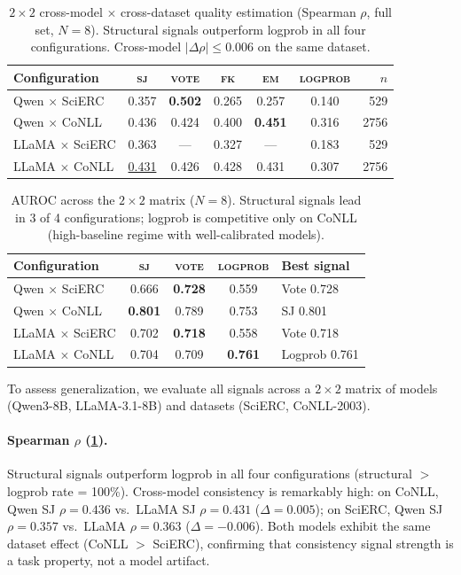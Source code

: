 \documentclass[11pt]{article}
\begin{document}
\begin{table}[t]
\centering
\caption{$2{\times}2$ cross-model $\times$ cross-dataset quality estimation (Spearman $\rho$, full set, $N{=}8$). Structural signals outperform logprob in all four configurations. Cross-model $|\Delta\rho| \le 0.006$ on the same dataset.}
\label{tab:2x2-rho}
\small
\begin{tabular}{l ccccc r}
\toprule
Configuration & \textsc{sj} & \textsc{vote} & \textsc{fk} & \textsc{em} & \textsc{logprob} & $n$ \\
\midrule
Qwen $\times$ SciERC   & 0.357 & \textbf{0.502} & 0.265 & 0.257 & 0.140 & 529 \\
Qwen $\times$ CoNLL    & 0.436 & 0.424 & 0.400 & \textbf{0.451} & 0.316 & 2756 \\
LLaMA $\times$ SciERC  & 0.363 & --- & 0.327 & --- & 0.183 & 529 \\
LLaMA $\times$ CoNLL   & \underline{0.431} & 0.426 & 0.428 & 0.431 & 0.307 & 2756 \\
\bottomrule
\end{tabular}
\end{table}

\begin{table}[t]
\centering
\caption{AUROC across the $2{\times}2$ matrix ($N{=}8$). Structural signals lead in 3 of 4 configurations; logprob is competitive only on CoNLL (high-baseline regime with well-calibrated models).}
\label{tab:2x2-auroc}
\small
\begin{tabular}{l ccc l}
\toprule
Configuration & \textsc{sj} & \textsc{vote} & \textsc{logprob} & Best signal \\
\midrule
Qwen $\times$ SciERC  & 0.666 & \textbf{0.728} & 0.559 & Vote 0.728 \\
Qwen $\times$ CoNLL   & \textbf{0.801} & 0.789 & 0.753 & SJ 0.801 \\
LLaMA $\times$ SciERC & 0.702 & \textbf{0.718} & 0.558 & Vote 0.718 \\
LLaMA $\times$ CoNLL  & 0.704 & 0.709 & \textbf{0.761} & Logprob 0.761 \\
\bottomrule
\end{tabular}
\end{table}

To assess generalization, we evaluate all signals across a $2{\times}2$ matrix of models (Qwen3-8B, LLaMA-3.1-8B) and datasets (SciERC, CoNLL-2003).

\paragraph{Spearman $\rho$ (\cref{tab:2x2-rho}).}
Structural signals outperform logprob in all four configurations (structural $>$ logprob rate = 100\%).
Cross-model consistency is remarkably high: on CoNLL, Qwen SJ $\rho{=}0.436$ vs.\ LLaMA SJ $\rho{=}0.431$ ($\Delta{=}0.005$); on SciERC, Qwen SJ $\rho{=}0.357$ vs.\ LLaMA $\rho{=}0.363$ ($\Delta{=}{-}0.006$).
Both models exhibit the same dataset effect (CoNLL $>$ SciERC), confirming that consistency signal strength is a task property, not a model artifact.
\end{document}
